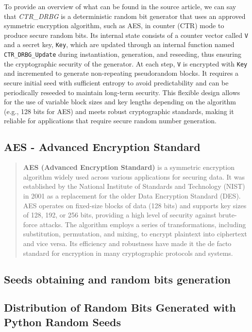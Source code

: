 To provide an overview of what can be found in the source article, we can say that \textit{CTR\_DRBG} is a deterministic random bit generator that uses an approved symmetric encryption algorithm, such as AES, in counter (CTR) mode to produce secure random bits. Its internal state consists of a counter vector called \texttt{V} and a secret key, \texttt{Key}, which are updated through an internal function named \texttt{CTR\_DRBG\_Update} during instantiation, generation, and reseeding, thus ensuring the cryptographic security of the generator. At each step, \texttt{V} is encrypted with \texttt{Key} and incremented to generate non-repeating pseudorandom blocks. It requires a secure initial seed with sufficient entropy to avoid predictability and can be periodically reseeded to maintain long-term security. This flexible design allows for the use of variable block sizes and key lengths depending on the algorithm (e.g., 128 bits for AES) and meets robust cryptographic standards, making it reliable for applications that require secure random number generation.

\subsection{AES - Advanced Encryption Standard}
\label{sec:aes}
\begin{quote}
\textbf{AES (Advanced Encryption Standard)} is a symmetric encryption algorithm widely used across various applications for securing data. It was established by the National Institute of Standards and Technology (NIST) in 2001 as a replacement for the older Data Encryption Standard (DES). AES operates on fixed-size blocks of data (128 bits) and supports key sizes of 128, 192, or 256 bits, providing a high level of security against brute-force attacks. The algorithm employs a series of transformations, including substitution, permutation, and mixing, to encrypt plaintext into ciphertext and vice versa. Its efficiency and robustness have made it the de facto standard for encryption in many cryptographic protocols and systems.
\end{quote}


\subsection{Seeds obtaining and random bits generation}
\label{sec:seeds_obtaining_random_bits_generation}

\subsection{Distribution of Random Bits Generated with Python Random Seeds}
\label{sec:distribution_python_seed}

